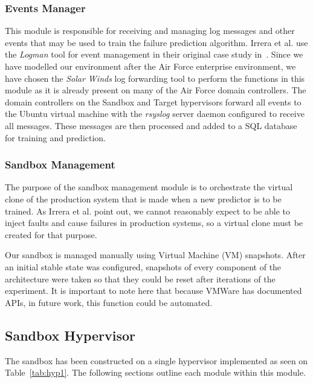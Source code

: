\subsubsection{Events Manager} \label{sec:eventsManagerMgr}
This module is responsible for receiving and managing log messages and other
events that may be used to train the failure prediction algorithm.  Irrera et
al. use the \emph{Logman} tool for event management in their original case
study in~\cite{irrera2015}.  Since we have modelled our environment after the
Air Force enterprise environment, we have chosen the \emph{Solar Winds} log
forwarding tool to perform the functions in this module as it is already
present on many of the Air Force domain controllers.  The domain controllers on
the Sandbox and Target hypervisors forward all events to the Ubuntu virtual
machine with the \emph{rsyslog} server daemon configured to receive all
messages.  These messages are then processed and added to a SQL database for
training and prediction.  

\subsubsection{Sandbox Management} \label{sec:sandboxMgr} 
The purpose of the sandbox management module is to orchestrate the virtual
clone of the production system that is made when a new predictor is to be
trained.  As Irrera et al. point out, we cannot reasonably expect to be able to
inject faults and cause failures in production systems, so a virtual clone must
be created for that purpose.

Our sandbox is managed manually using Virtual Machine (VM) snapshots.  After an
initial stable state was configured, snapshots of every component of the
architecture were taken so that they could be reset after iterations of the
experiment.  It is important to note here that because VMWare has documented
APIs, in future work, this function could be automated.

\subsection{Sandbox Hypervisor} \label{sec:sandbox}
The sandbox has been constructed on a single hypervisor implemented as seen on
Table~\ref{tab:hyp1}.  The following sections outline each module within this
module.

